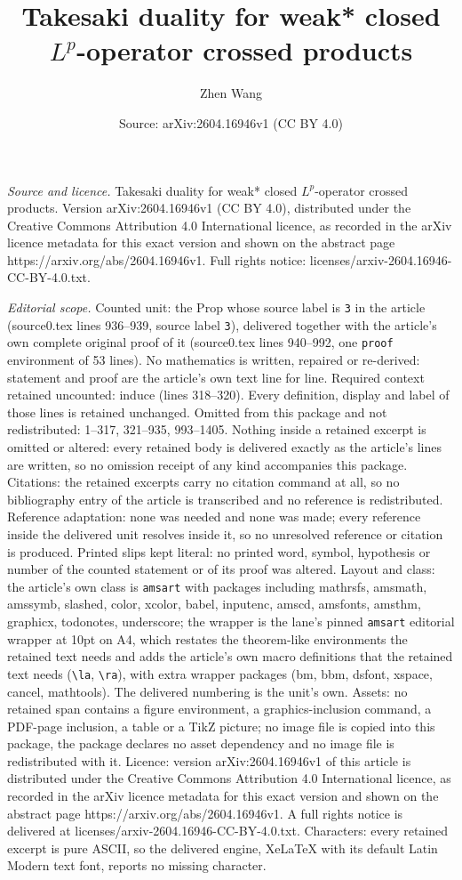 \documentclass[10pt,a4paper]{amsart}
\title[Takesaki duality for weak* closed $L^p$-operator crossed pro]{Takesaki duality for weak* closed $L^p$-operator crossed products}
\author{Zhen Wang}
\date{Source: arXiv:2604.16946v1 (CC BY 4.0)}
\begin{document}
\maketitle

\noindent\emph{Source and licence.} Takesaki duality for weak* closed $L^p$-operator crossed products. Version arXiv:2604.16946v1 (CC BY 4.0), distributed under the Creative Commons Attribution 4.0 International licence, as recorded in the arXiv licence metadata for this exact version and shown on the abstract page https://arxiv.org/abs/2604.16946v1. Full rights notice: licenses/arxiv-2604.16946-CC-BY-4.0.txt.\par\smallskip

\noindent\textit{Editorial scope.} Counted unit: the Prop whose source label is \texttt{3} in the article (source0.tex lines 936--939, source label \texttt{3}), delivered together with the article's own complete original proof of it (source0.tex lines 940--992, one \texttt{proof} environment of 53 lines). No mathematics is written, repaired or re-derived: statement and proof are the article's own text line for line. Required context retained uncounted: induce (lines 318--320). Every definition, display and label of those lines is retained unchanged. Omitted from this package and not redistributed: 1--317, 321--935, 993--1405. Nothing inside a retained excerpt is omitted or altered: every retained body is delivered exactly as the article's lines are written, so no omission receipt of any kind accompanies this package. Citations: the retained excerpts carry no citation command at all, so no bibliography entry of the article is transcribed and no reference is redistributed. Reference adaptation: none was needed and none was made; every reference inside the delivered unit resolves inside it, so no unresolved reference or citation is produced. Printed slips kept literal: no printed word, symbol, hypothesis or number of the counted statement or of its proof was altered. Layout and class: the article's own class is \texttt{amsart} with packages including mathrsfs, amsmath, amssymb, slashed, color, xcolor, babel, inputenc, amscd, amsfonts, amsthm, graphicx, todonotes, underscore; the wrapper is the lane's pinned \texttt{amsart} editorial wrapper at 10pt on A4, which restates the theorem-like environments the retained text needs and adds the article's own macro definitions that the retained text needs (\texttt{\textbackslash la}, \texttt{\textbackslash ra}), with extra wrapper packages (bm, bbm, dsfont, xspace, cancel, mathtools). The delivered numbering is the unit's own. Assets: no retained span contains a figure environment, a graphics-inclusion command, a PDF-page inclusion, a table or a TikZ picture; no image file is copied into this package, the package declares no asset dependency and no image file is redistributed with it. Licence: version arXiv:2604.16946v1 of this article is distributed under the Creative Commons Attribution 4.0 International licence, as recorded in the arXiv licence metadata for this exact version and shown on the abstract page https://arxiv.org/abs/2604.16946v1. A full rights notice is delivered at licenses/arxiv-2604.16946-CC-BY-4.0.txt. Characters: every retained excerpt is pure ASCII, so the delivered engine, XeLaTeX with its default Latin Modern text font, reports no missing character.
\end{document}
